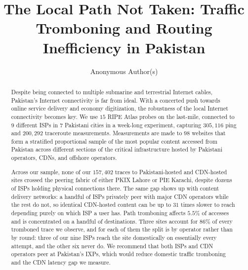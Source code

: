 \documentclass[sigconf,anonymous,10pt]{acmart}
\begin{document}
\title{The Local Path Not Taken: Traffic Tromboning and Routing Inefficiency in Pakistan}

\author{Anonymous Author(s)}

\renewcommand{\shortauthors}{Anonymous et al.}

\begin{abstract}
Despite being connected to multiple submarine and terrestrial Internet cables, Pakistan's Internet connectivity is far from ideal. With a concerted push towards online service delivery and economy digitization, the robustness of the local Internet connectivity becomes key. We use $15$ RIPE Atlas probes on the last-mile, connected to $9$ different ISPs in $7$ Pakistani cities in a week-long experiment, capturing $305,116$ ping and $200,292$ traceroute measurements. Measurements are made to $98$ websites that form a stratified proportional sample of the most popular content accessed from Pakistan across different sections of the critical infrastructure hosted by Pakistani operators, CDNs, and offshore operators.  

Across our sample, none of our $157{,}402$ traces to Pakistani-hosted and CDN-hosted sites crossed the peering fabric of either PKIX Lahore or PIE Karachi, despite dozens of ISPs holding physical connections there. The same gap shows up with content delivery networks: a handful of ISPs privately peer with major CDN operators while the rest do not, so identical CDN-hosted content can be up to $31$ times slower to reach depending purely on which ISP a user has. Path tromboning affects $5.5\%$ of accesses and is concentrated on a handful of destinations. Three sites account for $86\%$ of every tromboned trace we observe, and for each of them the split is by operator rather than by round: three of our nine ISPs reach the site domestically on essentially every attempt, and the other six never do. We recommend that both ISPs and CDN operators peer at Pakistan's IXPs, which would reduce domestic traffic tromboning and the CDN latency gap we measure.


\end{abstract}
\end{document}
